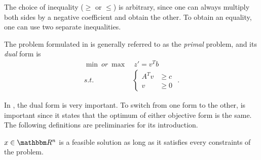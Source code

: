 
The choice of inequality ($\geq$ or $\leq$) is arbitrary, since one can always
multiply both sides by a negative coefficient and obtain the other. To obtain an
equality, one can use two separate inequalities.

The problem formulated in  is generally referred to as the
\textit{primal} problem, and its \textit{dual} form is
\begin{equation}
\begin{aligned}
    \min \ or\ \max & \ z' = v^T b \\
    s.t. &
    \begin{cases}
    A^Tv & \geq c \\
    v & \geq 0
    \end{cases} \text{ .}
\end{aligned} \label{eq:dual-primal}
\end{equation}

In , the dual form is very important. To switch from one
form to the other,  is important since it states that
the optimum of either objective form is the same. The following definitions are
preliminaries for its introduction.


\begin{definition}
$x\in \mathbbm R^n$ is a feasible solution as long as it satisfies every
constraints of the problem.
\end{definition}

